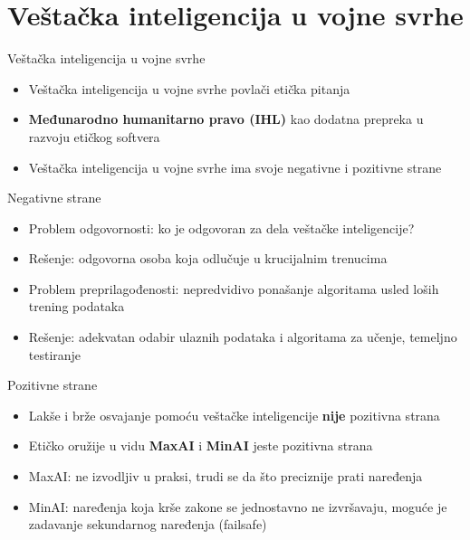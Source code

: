 \documentclass[14pt, aspectratio=169]{beamer}
\begin{document}

\section{Veštačka inteligencija u vojne svrhe}

\begin{frame}{Veštačka inteligencija u vojne svrhe}
    \begin{itemize}
    
        \item Veštačka inteligencija u vojne svrhe povlači etička pitanja
        \item \textbf{Međunarodno humanitarno pravo (IHL)} kao dodatna prepreka u razvoju etičkog softvera
        \item Veštačka inteligencija u vojne svrhe ima svoje negativne i pozitivne strane
        
    \end{itemize}
\end{frame}

\begin{frame}{Negativne strane}
    \begin{itemize}
        \item<1-> Problem odgovornosti: ko je odgovoran za dela veštačke inteligencije?
        \item<2-> Rešenje: odgovorna osoba koja odlučuje u krucijalnim trenucima
        \item<3-> Problem preprilagođenosti: nepredvidivo ponašanje algoritama usled loših trening podataka
        \item<4-> Rešenje: adekvatan odabir ulaznih podataka i algoritama za učenje, temeljno testiranje
    \end{itemize}
\end{frame}

\begin{frame}{Pozitivne strane}
    \begin{itemize}
        \item<1-> Lakše i brže osvajanje pomoću veštačke inteligencije \textbf{nije} pozitivna strana
        \item<2-> Etičko oružije u vidu \textbf{MaxAI} i \textbf{MinAI} jeste pozitivna strana
        \item<3-> MaxAI: ne izvodljiv u praksi, trudi se da što preciznije prati naređenja
        \item<4-> MinAI: naređenja koja krše zakone se jednostavno ne izvršavaju, moguće je zadavanje sekundarnog naređenja (failsafe)
    \end{itemize}    
\end{frame}
\end{document}
